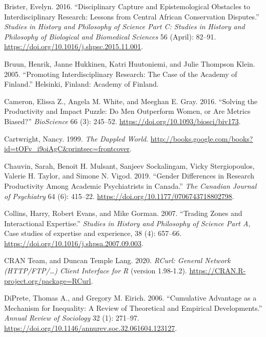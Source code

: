 \documentclass[
  11pt,
]{article}
\newlength{\cslhangindent}
\newenvironment{CSLReferences}[2] %
 {%
  \setlength{\parindent}{0pt}
  \ifodd #1 \everypar{\setlength{\hangindent}{\cslhangindent}}\ignorespaces\fi
  \ifnum #2 > 0
  \setlength{\parskip}{#2\baselineskip}
  \fi
 }%
 {}
\begin{document}
\begin{CSLReferences}{1}{0}
\leavevmode{}%
Brister, Evelyn. 2016. {``Disciplinary Capture and Epistemological Obstacles to Interdisciplinary Research: Lessons from Central African Conservation Disputes.''} \emph{Studies in History and Philosophy of Science Part C: Studies in History and Philosophy of Biological and Biomedical Sciences} 56 (April): 82--91. \url{https://doi.org/10.1016/j.shpsc.2015.11.001}.

\leavevmode{}%
Bruun, Henrik, Janne Hukkinen, Katri Huutoniemi, and Julie Thompson Klein. 2005. {``Promoting Interdisciplinary Research: The Case of the Academy of Finland.''} Helsinki, Finland: Academy of Finland.

\leavevmode{}%
Cameron, Elissa Z., Angela M. White, and Meeghan E. Gray. 2016. {``Solving the Productivity and Impact Puzzle: Do Men Outperform Women, or Are Metrics Biased?''} \emph{BioScience} 66 (3): 245--52. \url{https://doi.org/10.1093/biosci/biv173}.

\leavevmode{}%
Cartwright, Nancy. 1999. \emph{The Dappled World}. \url{http://books.google.com/books?id=tOFv_i9oiAgC\&printsec=frontcover}.

\leavevmode{}%
Chauvin, Sarah, Benoit H. Mulsant, Sanjeev Sockalingam, Vicky Stergiopoulos, Valerie H. Taylor, and Simone N. Vigod. 2019. {``Gender Differences in Research Productivity Among Academic Psychiatrists in Canada.''} \emph{The Canadian Journal of Psychiatry} 64 (6): 415--22. \url{https://doi.org/10.1177/0706743718802798}.

\leavevmode{}%
Collins, Harry, Robert Evans, and Mike Gorman. 2007. {``Trading Zones and Interactional Expertise.''} \emph{Studies in History and Philosophy of Science Part A}, Case studies of expertise and experience, 38 (4): 657--66. \url{https://doi.org/10.1016/j.shpsa.2007.09.003}.

\leavevmode{}%
CRAN Team, and Duncan Temple Lang. 2020. \emph{RCurl: General Network (HTTP/FTP/\ldots) Client Interface for R} (version 1.98-1.2). \url{https://CRAN.R-project.org/package=RCurl}.

\leavevmode{}%
DiPrete, Thomas A., and Gregory M. Eirich. 2006. {``Cumulative Advantage as a Mechanism for Inequality: A Review of Theoretical and Empirical Developments.''} \emph{Annual Review of Sociology} 32 (1): 271--97. \url{https://doi.org/10.1146/annurev.soc.32.061604.123127}.


\end{CSLReferences}
\end{document}
